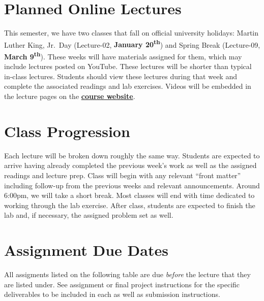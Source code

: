 \documentclass[]{book}
\begin{document}
\hypertarget{planned-online-lectures}{%
\section{Planned Online Lectures}\label{planned-online-lectures}}

This semester, we have two classes that fall on official university holidays: Martin Luther King, Jr.~Day (Lecture-02, \textbf{January 20\textsuperscript{th}}) and Spring Break (Lecture-09, \textbf{March 9\textsuperscript{th}}). These weeks will have materials assigned for them, which may include lectures posted on YouTube. These lectures will be shorter than typical in-class lectures. Students should view these lectures during that week and complete the associated readings and lab exercises. Videos will be embedded in the lecture pages on the \href{https://slu-soc5650.github.io/}{\textbf{course website}}.

\hypertarget{class-progression}{%
\section{Class Progression}\label{class-progression}}

Each lecture will be broken down roughly the same way. Students are expected to arrive having already completed the previous week's work as well as the assigned readings and lecture prep. Class will begin with any relevant ``front matter'' including follow-up from the previous weeks and relevant announcements. Around 6:00pm, we will take a short break. Most classes will end with time dedicated to working through the lab exercise. After class, students are expected to finish the lab and, if necessary, the assigned problem set as well.

\hypertarget{assignment-due-dates}{%
\section{Assignment Due Dates}\label{assignment-due-dates}}

All assigments listed on the following table are due \emph{before} the lecture that they are listed under. See assignment or final project instructions for the specific deliverables to be included in each as well as submission instructions.
\end{document}
